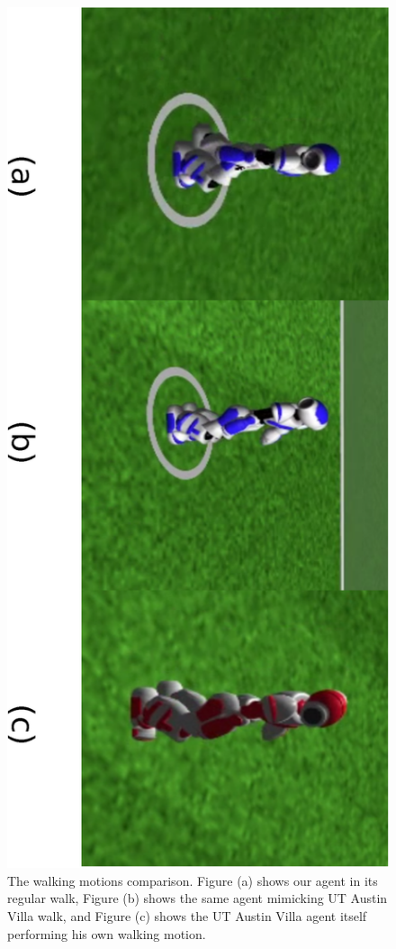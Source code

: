 \begin{figure}[!htbp]
\centering
\includegraphics[angle=90, width=1\textwidth]{Cap6/walkings}
\caption{The walking motions comparison. Figure (a) shows our agent in its regular walk, Figure (b) shows the same agent mimicking UT Austin Villa walk, and Figure (c) shows the UT Austin Villa agent itself performing his own walking motion.}
\label{fig:walkings}
\end{figure}

